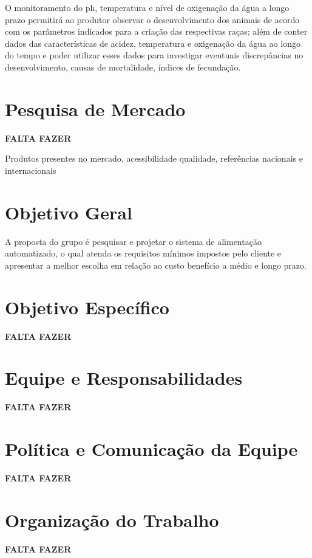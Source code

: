 O monitoramento do ph, temperatura e nível de oxigenação da água a longo prazo permitirá ao produtor observar o desenvolvimento dos animais de acordo com os parâmetros indicados para a criação das respectivas raças; além de conter dados das características de acidez, temperatura e oxigenação da água ao longo do tempo e poder utilizar esses dados para investigar eventuais discrepâncias no desenvolvimento, causas de mortalidade, índices de fecundação.

\section{Pesquisa de Mercado}

\textbf{FALTA FAZER}

Produtos presentes no mercado, acessibilidade qualidade, referências nacionais e internacionais

\section{Objetivo Geral}
A proposta do grupo é pesquisar e projetar o sistema de alimentação automatizado, o qual atenda os requisitos mínimos impostos pelo cliente e apresentar a melhor escolha em relação ao custo benefício a médio e longo prazo.

\section{Objetivo Específico}
\textbf{FALTA FAZER}
\section{Equipe e Responsabilidades}
\textbf{FALTA FAZER}
\section{Política e Comunicação da Equipe}
\textbf{FALTA FAZER}
\section{Organização do Trabalho}
\textbf{FALTA FAZER}
